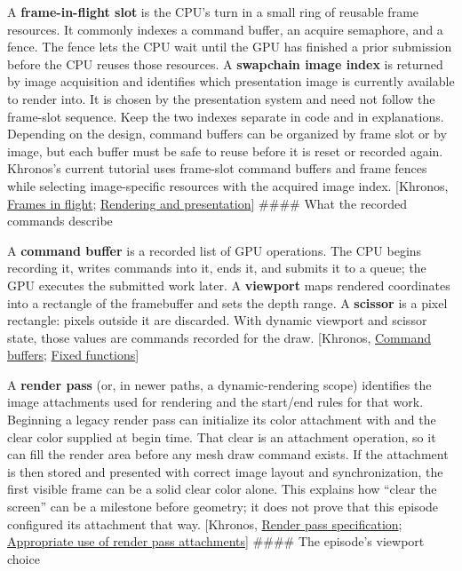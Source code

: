 A \textbf{frame-in-flight slot} is the CPU's turn in a small ring of reusable frame resources. It commonly indexes a command buffer, an acquire semaphore, and a fence. The fence lets the CPU wait until the GPU has finished a prior submission before the CPU reuses those resources. A \textbf{swapchain image index} is returned by image acquisition and identifies which presentation image is currently available to render into. It is chosen by the presentation system and need not follow the frame-slot sequence. Keep the two indexes separate in code and in explanations. Depending on the design, command buffers can be organized by frame slot or by image, but each buffer must be safe to reuse before it is reset or recorded again. Khronos's current tutorial uses frame-slot command buffers and frame fences while selecting image-specific resources with the acquired image index. {[}Khronos, \href{https://docs.vulkan.org/tutorial/latest/03_Drawing_a_triangle/03_Drawing/03_Frames_in_flight.html}{Frames in flight}; \href{https://docs.vulkan.org/tutorial/latest/03_Drawing_a_triangle/03_Drawing/02_Rendering_and_presentation.html}{Rendering and presentation}{]} \#\#\#\# What the recorded commands describe

A \textbf{command buffer} is a recorded list of GPU operations. The CPU begins recording it, writes commands into it, ends it, and submits it to a queue; the GPU executes the submitted work later. A \textbf{viewport} maps rendered coordinates into a rectangle of the framebuffer and sets the depth range. A \textbf{scissor} is a pixel rectangle: pixels outside it are discarded. With dynamic viewport and scissor state, those values are commands recorded for the draw. {[}Khronos, \href{https://docs.vulkan.org/tutorial/latest/03_Drawing_a_triangle/03_Drawing/01_Command_buffers.html}{Command buffers}; \href{https://docs.vulkan.org/tutorial/latest/03_Drawing_a_triangle/02_Graphics_pipeline_basics/02_Fixed_functions.html}{Fixed functions}{]}

A \textbf{render pass} (or, in newer paths, a dynamic-rendering scope) identifies the image attachments used for rendering and the start/end rules for that work. Beginning a legacy render pass can initialize its color attachment with  and the clear color supplied at begin time. That clear is an attachment operation, so it can fill the render area before any mesh draw command exists. If the attachment is then stored and presented with correct image layout and synchronization, the first visible frame can be a solid clear color alone. This explains how ``clear the screen'' can be a milestone before geometry; it does not prove that this episode configured its attachment that way. {[}Khronos, \href{https://docs.vulkan.org/spec/latest/chapters/renderpass.html}{Render pass specification}; \href{https://docs.vulkan.org/samples/latest/samples/performance/render_passes/README.html}{Appropriate use of render pass attachments}{]} \#\#\#\# The episode's viewport choice


